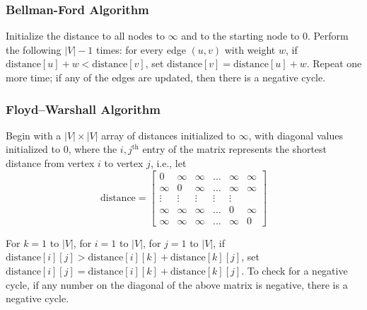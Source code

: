 \documentclass[a4paper]{article}
\theoremstyle{definition}
\begin{document}
\subsubsection{Bellman-Ford Algorithm}
Initialize the distance to all nodes to $\infty$ and to the starting node to 0. Perform the following $|V|-1$ times: for every edge $(u, v)$ with weight $w$, if $\text{distance}[u]+w<\text{distance}[v]$, set $\text{distance}[v]=\text{distance}[u]+w$. Repeat one more time; if any of the edges are updated, then there is a negative cycle. 
\subsubsection{Floyd–Warshall Algorithm}
Begin with a $|V|\times|V|$ array of distances initialized to $\infty$, with diagonal values initialized to 0, where the $i,j^{\text{th}}$ entry of the matrix represents the shortest distance from vertex $i$ to vertex $j$, i.e., let \[\text{distance}=\begin{bmatrix}
0&\infty&\infty&\hdots&\infty&\infty\\
\infty&0&\infty&\hdots&\infty&\infty\\
\vdots&\vdots&\vdots&\vdots&\vdots\\
\infty&\infty&\infty&\hdots&0&\infty\\
\infty&\infty&\infty&\hdots&\infty&0
\end{bmatrix}\]

For $k=1$ to $|V|$, for $i=1$ to $|V|$, for $j=1$ to $|V|$, if $\text{distance}[i][j]>\text{distance}[i][k]+\text{distance}[k][j]$, set $\text{distance}[i][j]=\text{distance}[i][k]+\text{distance}[k][j]$. To check for a negative cycle, if any number on the diagonal of the above matrix is negative, there is a negative cycle. 
\end{document}
